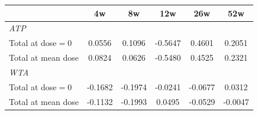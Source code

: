 \begin{tabular}{l*{5}{c}}
\toprule
 & 4w & 8w & 12w & 26w & 52w \\
\midrule
\multicolumn{6}{l}{\textit{ATP}} \\
\quad Total at dose$=0$ & 0.0556 & 0.1096 & -0.5647 & 0.4601 & 0.2051 \\
\quad Total at mean dose & 0.0824 & 0.0626 & -0.5480 & 0.4525 & 0.2321 \\[0.3em]
\multicolumn{6}{l}{\textit{WTA}} \\
\quad Total at dose$=0$ & -0.1682 & -0.1974 & -0.0241 & -0.0677 & 0.0312 \\
\quad Total at mean dose & -0.1132 & -0.1993 & 0.0495 & -0.0529 & -0.0047 \\
\bottomrule
\end{tabular}
